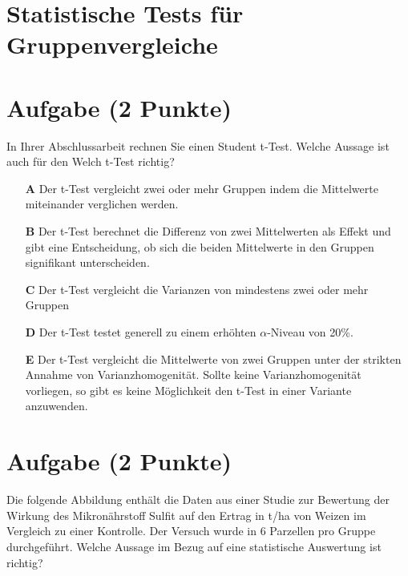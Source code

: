 \documentclass[a4paper, 9pt]{scrartcl}\usepackage[]{graphicx}\usepackage[]{xcolor}
\begin{document}
\section*{Statistische Tests für Gruppenvergleiche} 

\section{Aufgabe \hfill (2 Punkte)}



In Ihrer Abschlussarbeit rechnen Sie einen Student t-Test. Welche Aussage ist auch für den Welch t-Test richtig?



\begin{enumerate}
\item [\textbf{A} \msquare] Der t-Test vergleicht zwei oder mehr Gruppen indem die Mittelwerte miteinander verglichen werden.
\item [\textbf{B} \msquare] Der t-Test berechnet die Differenz von zwei Mittelwerten als Effekt und gibt eine Entscheidung, ob sich die beiden Mittelwerte in den Gruppen signifikant unterscheiden.
\item [\textbf{C} \msquare] Der t-Test vergleicht die Varianzen von mindestens zwei oder mehr Gruppen
\item [\textbf{D} \msquare] Der t-Test testet generell zu einem erhöhten $\alpha$-Niveau von 20\%.
\item [\textbf{E} \msquare] Der t-Test vergleicht die Mittelwerte von zwei Gruppen unter der strikten Annahme von Varianzhomogenität. Sollte keine Varianzhomogenität vorliegen, so gibt es keine Möglichkeit den t-Test in einer Variante anzuwenden.
\end{enumerate}

\section{Aufgabe \hfill (2 Punkte)}



Die folgende Abbildung enthält die Daten aus einer Studie zur Bewertung der Wirkung des Mikronährstoff Sulfit auf den Ertrag in t/ha von Weizen im Vergleich zu einer Kontrolle. Der Versuch wurde in 6 Parzellen pro Gruppe durchgeführt. Welche Aussage im Bezug auf eine statistische Auswertung ist richtig?
\end{document}
